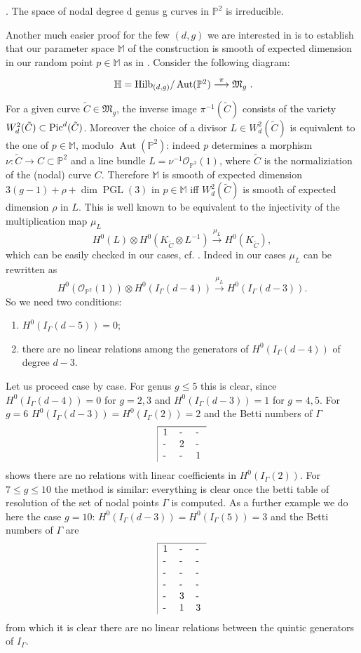 \documentclass[12pt,leqno]{amsart}
\newcommand{\MM}{{\mathbb M}}
\newcommand{\PP}{{\mathbb P}}
\newcommand{\HH}{{\mathbb H}}
\newcommand{\Hilb}{{\rm{Hilb}}}
\newcommand{\Pic}{{\rm{Pic}}}
\newcommand{\ko}{{\mathcal O}}
\newcommand{\lra}{\longrightarrow}
\newlength{\ho}
\DeclareMathOperator{\Aut}{Aut}
\DeclareMathOperator{\PGL}{PGL}
\newcommand{\gM}{\mathfrak M}
\begin{document}
\begin{theorem}\cite{Ha1}. The space
of nodal degree d genus g curves in $\PP^2$ is irreducible.
\end{theorem}

Another much easier proof for the few $(d,g)$ we are interested in is to
establish that our parameter space $\MM$ of the construction is smooth of 
expected dimension in our random point $p \in \MM$ as in \cite{AC}.
Consider the following diagram:
$$\xymatrix{\HH = {\Hilb}_{(d,g)}/\Aut(\PP^2) \stackrel{\pi}{\lra} \gM_g}.$$
For a given curve ${\tilde C}\in\gM_g$, the inverse image $\pi^{-1} ({\tilde C})$ 
consists of the variety $W^2_d({\tilde C})\subset\Pic^d({\tilde C})$.
Moreover the choice of a divisor $L\in W^2_d({\tilde C})$ is equivalent to the one 
of $p \in \MM$, modulo $\Aut(\PP^2)$: 
indeed $p$ determines a morphism $\nu\colon {\tilde C} \lra C\subset \PP^2$ 
and a line bundle $L=\nu^{-1}\ko_{\PP^2}(1)$, where ${\tilde C}$ is the 
normaliziation of the (nodal) curve $C$.
Therefore $\MM$ is smooth of expected dimension $3(g-1)+\rho+\dim \PGL(3)$
in $p \in \MM$ 
iff $W^2_d({\tilde C})$ is smooth of expected dimension $\rho$ in $L$.
This is well known to be equivalent to the injectivity of the multiplication map
$\mu_L$
$$
H^0(L)\otimes H^0(K_{\tilde C}\otimes L^{-1}) \stackrel{\mu_L}{\lra}H^0(K_{\tilde C}),
$$
which can be easily checked in our cases,
cf. \cite[p. 189]{ACGH}.
Indeed in our cases $\mu_L$ can be rewritten as 
$$
H^0(\ko_{\PP^2}(1))\otimes H^0(I_\Gamma(d-4)) \stackrel{\mu_L}{\lra}
H^0(I_\Gamma(d-3)).
$$
So we need two conditions: 
\begin{enumerate}
\item $H^0(I_\Gamma(d-5))=0$;
\item there are no linear relations among the generators of $H^0(I_\Gamma(d-4))$ of 
degree $d-3$.
\end{enumerate}
Let us proceed case by case.
For genus $g\leq 5$ this is clear, since $H^0(I_\Gamma(d-4))=0$ for $g=2,3$ and
$H^0(I_\Gamma(d-3))=1$ for $g=4,5$. 
For $g=6$ $H^0(I_\Gamma(d-3))=H^0(I_\Gamma(2))=2$ and 
the Betti numbers of $\Gamma$ 
$$
\begin{tabular}{|lll}\hline
1 & - & - \cr
- & 2 & - \cr
- & - & 1 \cr
\end{tabular}
$$
shows there are no relations 
with linear coefficients in $H^0(I_\Gamma(2))$.
For $7\leq g \leq 10$ the method is similar:
everything is clear once the betti table of resolution of the set of nodal points 
$\Gamma$ is computed. As a further example we do here the case $g=10$:
$H^0(I_\Gamma(d-3))=H^0(I_\Gamma(5))=3$ and the Betti numbers of $\Gamma$ are
$$
\begin{tabular}{|lll}\hline
1 & - & - \cr
- & - & - \cr
- & - & - \cr
- & - & - \cr
- & 3 & - \cr
- & 1 & 3 \cr
\end{tabular}
$$
from which it is clear there are no linear relations between the quintic generators
of $I_\Gamma$.
\end{document}
